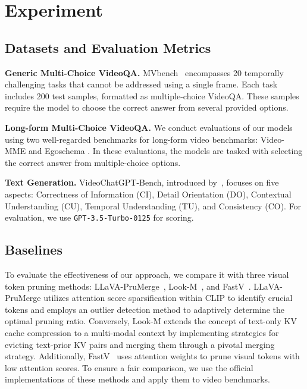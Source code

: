 \documentclass{article} %
\begin{document}
\section{Experiment}
\label{sec:exp}
\subsection{Datasets and Evaluation Metrics}
\textbf{Generic Multi-Choice VideoQA.} MVbench~\citep{videochat2} encompasses 20 temporally challenging tasks that cannot be addressed using a single frame. Each task includes 200 test samples, formatted as multiple-choice VideoQA. These samples require the model to choose the correct answer from several provided options.

\textbf{Long-form Multi-Choice VideoQA.} We conduct evaluations of our models using two well-regarded benchmarks for long-form video benchmarks: Video-MME \citep{videomme} and Egoschema \citep{egoschema}. In these evaluations, the models are tasked with selecting the correct answer from multiple-choice options.

\textbf{Text Generation.} VideoChatGPT-Bench, introduced by~\citep{videochatgpt}, focuses on five aspects: Correctness of Information (CI), Detail Orientation (DO), Contextual Understanding (CU), Temporal Understanding (TU), and Consistency (CO). For evaluation, we use \texttt{GPT-3.5-Turbo-0125} for scoring.

\subsection{Baselines}

To evaluate the effectiveness of our approach, we compare it with three visual token pruning methods: LLaVA-PruMerge~\citep{llavaprumerge}, Look-M~\citep{look-m}, and FastV~\citep{fastv}. LLaVA-PruMerge utilizes attention score sparsification within CLIP to identify crucial tokens and employs an outlier detection method to adaptively determine the optimal pruning ratio. Conversely, Look-M extends the concept of text-only KV cache compression to a multi-modal context by implementing strategies for evicting text-prior KV pairs and merging them through a pivotal merging strategy. Additionally, FastV~\citep{fastv} uses attention weights to prune visual tokens with low attention scores. To ensure a fair comparison, we use the official implementations of these methods and apply them to video benchmarks.
\end{document}
